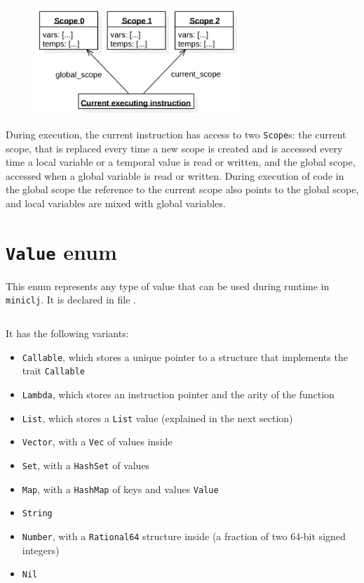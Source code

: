 \documentclass[11pt]{scrreprt}
\begin{document}
\begin{figure}[H]
  \centering
  \includegraphics[width=220pt]{MemoryDiagram.png}
\end{figure}

During execution, the current instruction has access to two \texttt{Scope}s: the current scope, that is replaced every time a new scope is created and is accessed every time a local variable or a temporal value is read or written, and the global scope, accessed when a global variable is read or written. During execution of code in the global scope the reference to the current scope also points to the global scope, and local variables are mixed with global variables.

\section{\texttt{Value} enum}
This enum represents any type of value that can be used during runtime in \texttt{miniclj}. It is declared in file .

\inputminted[firstline=16,lastline=30]{rust}{/home/mario/git/MarioJim/miniclj/miniclj-lib/src/vm/value.rs}

It has the following variants:
\begin{itemize}
  \item \texttt{Callable}, which stores a unique pointer to a structure that implements the trait \texttt{Callable}
  \item \texttt{Lambda}, which stores an instruction pointer and the arity of the function
  \item \texttt{List}, which stores a \texttt{List} value (explained in the next section)
  \item \texttt{Vector}, with a \texttt{Vec} of values inside
  \item \texttt{Set}, with a \texttt{HashSet} of values
  \item \texttt{Map}, with a \texttt{HashMap} of keys and values \texttt{Value}
  \item \texttt{String}
  \item \texttt{Number}, with a \texttt{Rational64} structure inside (a fraction of two 64-bit signed integers)
  \item \texttt{Nil}
\end{itemize}
\end{document}

